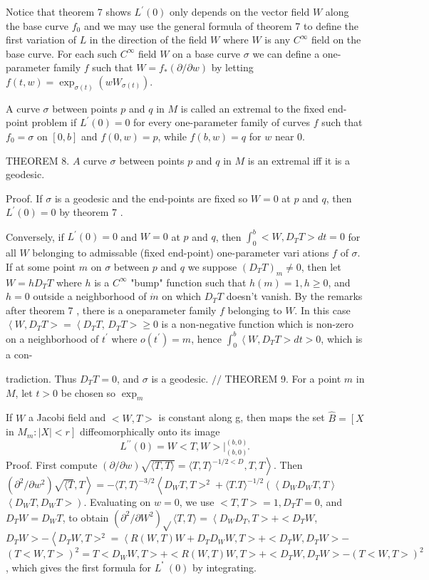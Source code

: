 \documentclass[10pt]{article}
\begin{document}
Notice that theorem 7 shows $L^{\prime}(0)$ only depends on the vector field $W$ along the base curve $f_{0}$ and we may use the general formula of theorem 7 to define the first variation of $L$ in the direction of the field $W$ where $W$ is any $C^{\infty}$ field on the base curve. For each such $C^{\infty}$ field $W$ on a base curve $\sigma$ we can define a one-parameter family $f$ such that $W=f_{*}(\partial / \partial w)$ by letting $f(t, w)=\exp _{\sigma(t)}\left(w W_{\sigma(t)}\right)$.

A curve $\sigma$ between points $p$ and $q$ in $M$ is called an extremal to the fixed end-point problem if $L^{\prime}(0)=0$ for every one-parameter family of curves $f$ such that $f_{0}=\sigma$ on $[0, b]$ and $f(0, w)=p$, while $f(b, w)=q$ for $w$ near $0 .$

THEOREM 8. $A$ curve $\sigma$ between points $p$ and $q$ in $M$ is an extremal iff it is a geodesic.

Proof. If $\sigma$ is a geodesic and the end-points are fixed so $W=0$ at $p$ and $q$, then $L^{\prime}(0)=0$ by theorem 7 .

Conversely, if $L^{\prime}(0)=0$ and $W=0$ at $p$ and $q$, then $\int_{0}^{b}<W, D_{T} T>d t=0$ for all $W$ belonging to admissable (fixed end-point) one-parameter vari ations $f$ of $\sigma .$ If at some point $m$ on $\sigma$ between $p$ and $q$ we suppose $\left(D_{T} T\right)_{m} \neq 0$, then let $W=h D_{T} T$ where $h$ is a $C^{\infty}$ "bump" function such that $h(m)=1, h \geq 0$, and $h=0$ outside a neighborhood of $\dot{m}$ on which $D_{T} T$ doesn't vanish. By the remarks after theorem 7 , there is a oneparameter family $f$ belonging to $W .$ In this case $\left\langle W, D_{T} T>=\left\langle D_{T} T\right.\right.$, $D_{T} T>\geq 0$ is a non-negative function which is non-zero on a neighborhood of $t^{\prime}$ where $o\left(t^{\prime}\right)=m$, hence $\int_{0}^{b}\left\langle W, D_{T} T>d t>0\right.$, which is a con-

tradiction. Thus $D_{T} T=0$, and $\sigma$ is a geodesic. $/ /$ THEOREM 9. For a point $m$ in $M$, let $t>0$ be chosen so $\exp _{m}$

If $W$ a Jacobi field and $<W, T>$ is constant along g, then maps the set $\hat{B}=\left[X\right.$ in $\left.M_{m}:|X|<r\right]$ diffeomorphically onto its image
$$
L^{\prime \prime}(0)=W<T, W>\left.\right|_{(b, 0)^{\circ}} ^{(b, 0)}
$$
Proof. First compute $\left.(\partial / \partial w) \sqrt{\langle T, T\rangle}=\langle T, T\rangle^{-1 / 2<D}, T, T\right\rangle$. Then $\left.\left(\partial^{2} / \partial w^{2}\right) \sqrt{\langle T}, T\right\rangle=-\langle T, T\rangle^{-3 / 2}\left\langle D_{W} T, T>^{2}+\langle T . T\rangle^{-1 / 2}\left(\left\langle D_{W} D_{W} T, T\right\rangle\right.\right.$ $\left\langle D_{W} T, D_{W} T>\right)$. Evaluating on $w=0$, we use $<T, T>=1, D_{T} T=0$, and $D_{T} W=D_{W} T$, to obtain $\left(\partial^{2} / \partial W^{2}\right) \sqrt{ }\langle T, T\rangle=\left\langle D_{W} D_{T}, T>+<D_{T} W\right.$, $D_{T} W>-\left\langle D_{T} W, T>^{2}=\left\langle R(W, T) W+D_{T} D_{W} W, T>+<D_{T} W, D_{T} W>-\right.\right.$ $(T<W, T>)^{2}=T<D_{W} W, T>+<R(W, T) W, T>+<D_{T} W, D_{T} W>-(T<W, T>)^{2}$, which gives the first formula for $L^{\text {" }}(0)$ by integrating.
\end{document}
